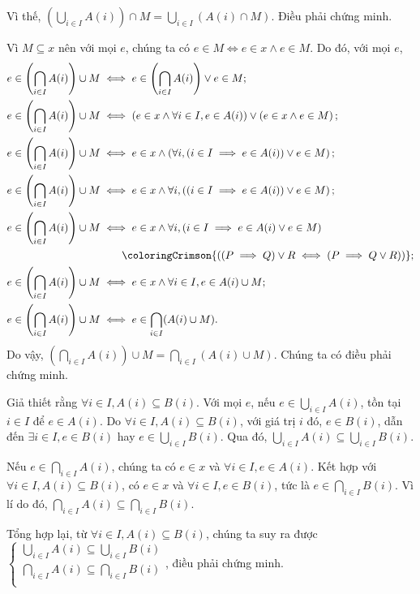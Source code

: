 Vì thế, $\left(\bigcup_{i \in I}A(i)\right) \cap M = \bigcup_{i \in I}(A(i) \cap M)$. Điều phải chứng minh.

\stepSubexercise Vì $M \subseteq x$ nên với mọi $e$, chúng ta có $e \in M \iff e \in x \land e \in M$. Do đó, với mọi $e$,
\begin{align*}
   e \in \left(\bigcap_{i \in I} A(i)\right) \cup M &\iff e \in \left(\bigcap_{i \in I} A(i)\right) \lor e \in M; \\
   e \in \left(\bigcap_{i \in I} A(i)\right) \cup M &\iff \left(e \in x \land \forall i \in I, e \in A(i)\right) \lor \left(e \in x \land e \in M\right); \\
   e \in \left(\bigcap_{i \in I} A(i)\right) \cup M &\iff e \in x \land \left(\forall i, (i \in I \implies e \in A(i)) \lor e \in M\right); \\
   e \in \left(\bigcap_{i \in I} A(i)\right) \cup M &\iff e \in x \land \forall i , \left((i \in I \implies e \in A(i)) \lor e \in M\right); \\
   e \in \left(\bigcap_{i \in I} A(i)\right) \cup M &\iff e \in x \land \forall i , \left(i \in I \implies e \in A(i) \lor e \in M\right) \\
   &\qquad \coloringCrimson{\left((P \implies Q) \lor R \iff (P \implies Q \lor R)\right)}; \\
   e \in \left(\bigcap_{i \in I} A(i)\right) \cup M &\iff e \in x \land \forall i \in I, e \in A(i) \cup M; \\
   e \in \left(\bigcap_{i \in I} A(i)\right) \cup M &\iff e \in \bigcap_{i \in I}(A(i) \cup M).
\end{align*}
Do vậy, $\left(\bigcap_{i \in I} A(i)\right) \cup M = \bigcap_{i \in I}(A(i) \cup M)$. Chúng ta có điều phải chứng minh.

\stepSubexercise Giả thiết rằng $\forall i \in I, A(i) \subseteq B(i)$. Với mọi $e$, nếu $e \in \bigcup_{i \in I}A(i)$, tồn tại $i \in I$ để $e \in A(i)$. Do $\forall i \in I, A(i) \subseteq B(i)$, với giá trị $i$ đó, $e \in B(i)$, dẫn đến $\exists i \in I, e \in B(i)$ hay $e \in \bigcup_{i \in I}B(i)$. Qua đó, $\bigcup_{i \in I}A(i) \subseteq \bigcup_{i \in I}B(i)$.

Nếu $e \in \bigcap_{i \in I}A(i)$, chúng ta có $e \in x$ và $\forall i \in I, e \in A(i)$. Kết hợp với $\forall i \in I, A(i) \subseteq B(i)$, có $e \in x$ và $\forall i \in I, e \in B(i)$, tức là $e \in \bigcap_{i \in I}B(i)$. Vì lí do đó, $\bigcap_{i \in I}A(i) \subseteq \bigcap_{i \in I}B(i)$.

Tổng hợp lại, từ $\forall i \in I, A(i) \subseteq B(i)$, chúng ta suy ra được $\begin{cases}
   \bigcup_{i \in I} A(i) \subseteq \bigcup_{i \in I}B(i) \\
   \bigcap_{i \in I} A(i) \subseteq \bigcap_{i \in I}B(i) \\
\end{cases}$, điều phải chứng minh.

